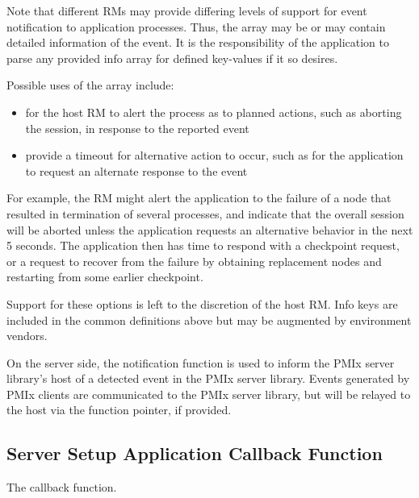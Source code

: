 \descr

Note that different \acp{RM} may provide differing levels of support for event notification to application processes. Thus, the  array may be  or may contain detailed information of the event. It is the responsibility of the application to parse any provided info array for defined key-values if it so desires.

\adviceuserstart
Possible uses of the  array include:

\begin{itemize}
\item for the host \ac{RM} to alert the process as to planned actions, such as aborting the session, in response to the reported event

\item provide a timeout for alternative action to occur, such as for the application to request an alternate response to the event
\end{itemize}

For example, the \ac{RM} might alert the application to the failure of a node that resulted in termination of several processes, and indicate that the overall session will be aborted unless the application requests an alternative behavior in the next 5 seconds. The application then has time to respond with a checkpoint request, or a request to recover from the failure by obtaining replacement nodes and restarting from some earlier checkpoint.

Support for these options is left to the discretion of the host \ac{RM}. Info keys are included in the common definitions above but may be augmented by environment vendors.
\adviceuserend

\advicermstart
On the server side, the notification function is used to inform the \ac{PMIx} server library's host of a detected event in the \ac{PMIx} server library. Events generated by \ac{PMIx} clients are communicated to the \ac{PMIx} server library, but will be relayed to the host via the  function pointer, if provided.
\advicermend

\subsection{Server Setup Application Callback Function}

The  callback function.

